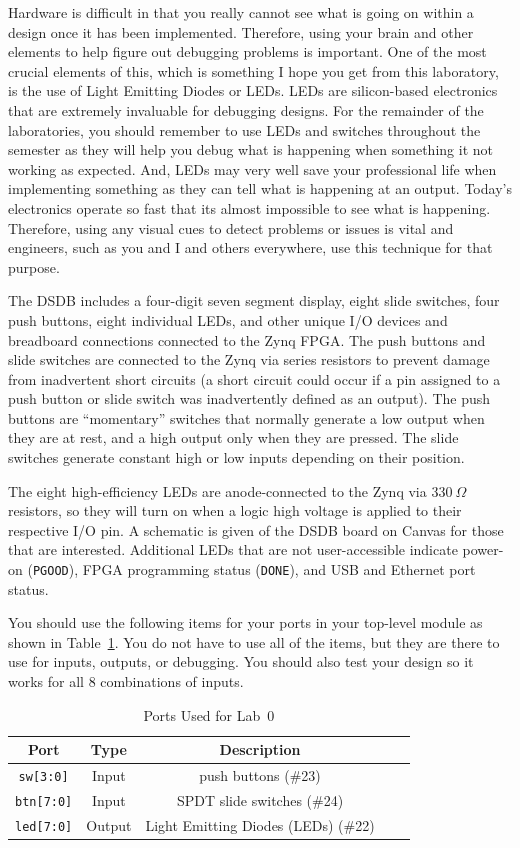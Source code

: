 \documentclass{article}
\begin{document}
Hardware is difficult in that you really cannot see what is going on
within a design once it has been implemented.  Therefore, using your
brain and other elements to help figure out debugging problems is
important.  One of the most crucial elements of this, which is
something I hope you get from this laboratory, is the use of Light
Emitting Diodes or LEDs.  LEDs are silicon-based electronics that are
extremely invaluable for debugging designs.
For the remainder of the laboratories, you should remember to use LEDs
and switches throughout the semester as they will help you debug what
is happening when something it not working as expected.
And, LEDs may very well save
your professional life when implementing something as they can tell
what is happening at an output.  Today's electronics operate so fast
that its almost impossible to see what is happening.  Therefore, using
any visual cues to detect problems or issues is vital and engineers,
such as you and I and others everywhere,  
use this technique for that purpose.

The DSDB includes a four-digit seven segment display, eight slide
switches, four push buttons,
eight individual LEDs, and other unique I/O devices and breadboard
connections
connected to the Zynq FPGA.
The push buttons and slide switches are
connected to the Zynq via series
resistors to prevent damage from inadvertent short circuits (a short
circuit could occur if a pin
assigned to a push button or slide switch was inadvertently defined as
an output). The push
buttons are “momentary” switches that normally generate a low output
when they are at rest, and
a high output only when they are pressed. The slide switches generate
constant high or low inputs depending on their position.

The eight high-efficiency LEDs are anode-connected to the Zynq via
$330~\Omega$ resistors, so they
will turn on when a logic high voltage is applied to their respective
I/O pin. A schematic is given of the DSDB board on Canvas for those
that are interested.  Additional LEDs
that are not user-accessible indicate power-on (\verb!PGOOD!), FPGA
programming status (\verb!DONE!), and USB and Ethernet port status.

You should use the following items for your ports in your top-level
module as shown in Table~\ref{ports.tbl}.  You do not have to use all
of the items, but they are there to use for inputs, outputs, or
debugging.  You should also test your design so it works for all $8$
combinations of inputs.
\begin{table}
  \centering
  \begin{tabular}{|c|c|c|c|c|} \hline
    Port & Type & Description \\ \hline \hline
    \verb!sw[3:0]! & Input & push buttons (\#23) \\ \hline
    \verb!btn[7:0]! & Input & SPDT slide switches (\#24)  \\ \hline
    \verb!led[7:0]! & Output & Light Emitting Diodes (LEDs) (\#22) \\ \hline
  \end{tabular}
  \caption{Ports Used for Lab~$0$}
  \label{ports.tbl}
\end{table}
\end{document}
